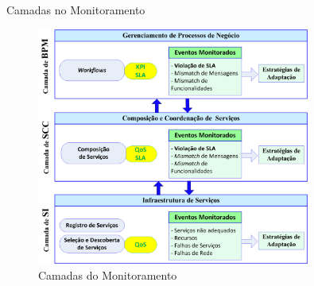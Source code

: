 \documentclass[xcolor=svgnames]{beamer}
\begin{document}
\begin{frame} {Camadas no Monitoramento }
{\begin{figure}[!h]
              \includegraphics[width=0.8\textwidth]{MonitoringLayers_3.png}
              \caption{Camadas do Monitoramento}
          \end{figure}	
        }
  \end{frame}
\end{document}
